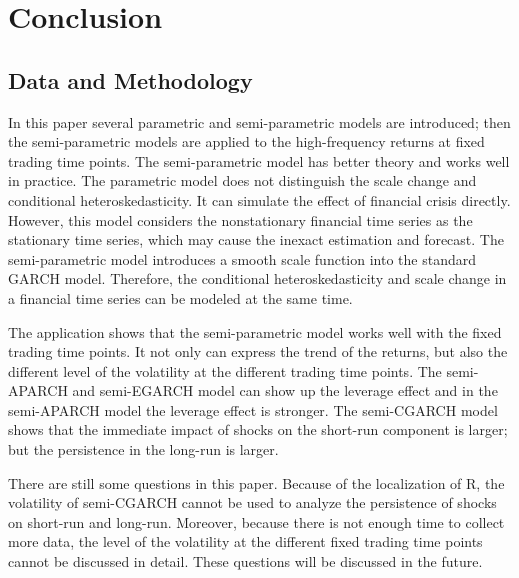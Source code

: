 \chapter{Conclusion}


\section{Data and Methodology}

In this paper several parametric and semi-parametric models are introduced; then the semi-parametric models are applied to the high-frequency returns at fixed trading time points. The semi-parametric model has better theory and works well in practice. The parametric model does not distinguish the scale change and conditional heteroskedasticity. It can simulate the effect of financial crisis directly. However, this model considers the nonstationary financial time series as the stationary time series, which may cause the inexact estimation and forecast. The semi-parametric model introduces a smooth scale function into the standard GARCH model. Therefore, the conditional heteroskedasticity and scale change in a financial time series can be modeled at the same time.

The application shows that the semi-parametric model works well with the fixed trading time points. It not only can express the trend of the returns, but also the different level of the volatility at the different trading time points. The semi-APARCH and semi-EGARCH model can show up the leverage effect and in the semi-APARCH model the leverage effect is stronger. The semi-CGARCH model shows that the immediate impact of shocks on the short-run component is larger; but the persistence in the long-run is larger.

There are still some questions in this paper. Because of the localization of R, the volatility of semi-CGARCH cannot be used to analyze the persistence of shocks on short-run and long-run. Moreover, because there is not enough time to collect more data, the level of the volatility at the different fixed trading time points cannot be discussed in detail. These questions will be discussed in the future.
